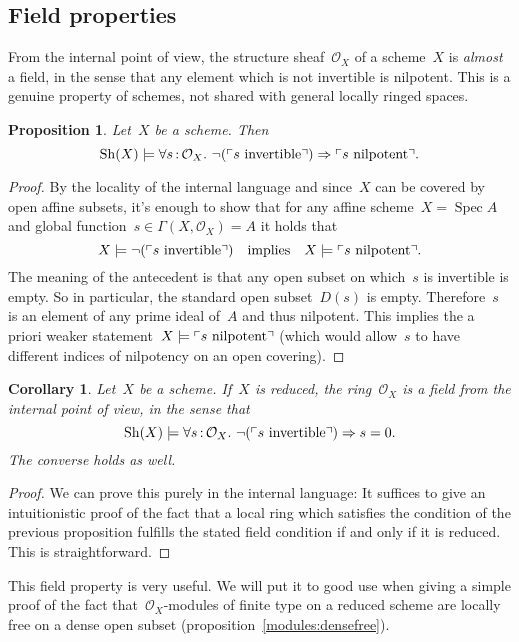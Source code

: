 \documentclass[10pt]{amsart}
\theoremstyle{definition}
\theoremstyle{plain}
\newtheorem{prop}[defn]{Proposition}
\newtheorem{cor}[defn]{Corollary}
\theoremstyle{remark}
\renewcommand{\O}{\mathcal{O}}
\newcommand{\Sh}{\mathrm{Sh}}
\DeclareMathOperator{\Spec}{Spec}
\newcommand{\?}{\,{:}\,}
\renewcommand{\_}{\mathpunct{.}\,}
\newcommand{\speak}[1]{\ulcorner\text{\textnormal{#1}}\urcorner}
\begin{document}
\subsection{Field properties} From the internal point of view, the structure
sheaf~$\O_X$ of a scheme~$X$ is \emph{almost} a field, in the sense that any
element which is not invertible is nilpotent. This is a genuine property of
schemes, not shared with general locally ringed spaces.

\begin{prop}Let~$X$ be a scheme. Then
\[ \Sh(X) \models \forall s\?\O_X\_ \neg(\speak{$s$ invertible}) \Rightarrow
\speak{$s$ nilpotent}. \]
\end{prop}
\begin{proof}By the locality of the internal language and since~$X$ can be
covered by open affine subsets, it's enough to show that for any affine
scheme~$X = \Spec A$ and global function~$s \in \Gamma(X,\O_X) = A$ it holds
that
\[ X \models \neg(\speak{$s$ invertible}) \quad\text{implies}\quad
  X \models \speak{$s$ nilpotent}. \]
The meaning of the antecedent is that any open subset on which~$s$ is
invertible is empty. So in particular, the standard open subset~$D(s)$ is
empty. Therefore~$s$ is an element of any prime ideal of~$A$ and thus
nilpotent. This implies the a priori weaker statement~$X \models \speak{$s$
nilpotent}$ (which would allow~$s$ to have different indices of nilpotency on
an open covering).
\end{proof}

\begin{cor}Let~$X$ be a scheme. If~$X$ is reduced, the ring~$\O_X$ is a field
from the internal point of view, in the sense that
\[ \Sh(X) \models \forall s\?\O_X\_ \neg(\speak{$s$ invertible}) \Rightarrow
s=0. \]
The converse holds as well.\end{cor}
\begin{proof}We can prove this purely in the internal language: It suffices to
give an intuitionistic proof of the fact that a local ring which satisfies the
condition of the previous proposition fulfills the stated field condition if
and only if it is reduced. This is straightforward.
\end{proof}

This field property is very useful. We will put it to good use when giving a
simple proof of the fact that~$\O_X$-modules of finite type on a reduced scheme
are locally free on a dense open subset (proposition~\ref{modules:densefree}).
\end{document}

